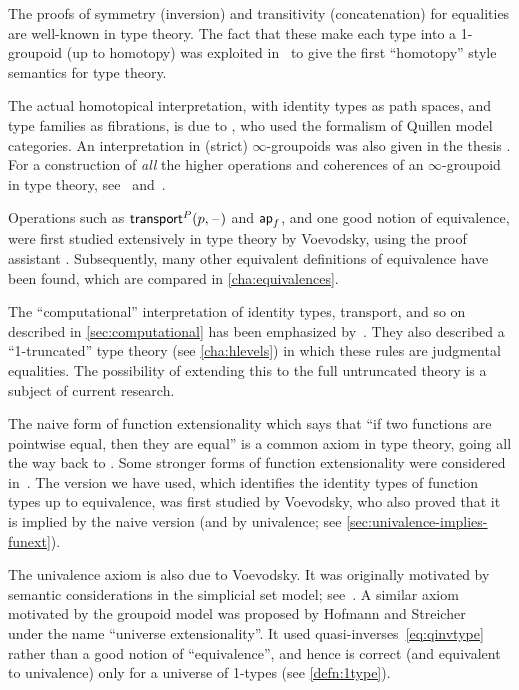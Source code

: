 The proofs of symmetry (inversion) and transitivity (concatenation) for equalities are well-known in type theory.
The fact that these make each type into a 1-groupoid (up to homotopy) was exploited in~\cite{hs:gpd-typethy} to give the first ``homotopy'' style semantics for type theory.  

The actual homotopical interpretation, with identity types as path spaces, and type families as fibrations, is due to \cite{AW}, who used the formalism of Quillen model categories.  An interpretation in (strict) $\infty$-groupoids was also given in the thesis \cite{mw:thesis}.
For a construction of \emph{all} the higher operations and coherences of an $\infty$-groupoid in type theory, see~\cite{pll:wkom-type} and~\cite{bg:type-wkom}.

%
Operations such as $\mathsf{transport}^{P}(p,\mathord{\hspace{1pt}\text{--}\hspace{1pt}})$ and $\mathsf{ap}_{f}$, and one good notion of equivalence, were first studied extensively in type theory by Voevodsky, using the proof assistant \Coq.
Subsequently, many other equivalent definitions of equivalence have been found, which are compared in \autoref{cha:equivalences}.

The ``computational'' interpretation of identity types, transport, and so on described in \autoref{sec:computational} has been emphasized by~\cite{lh:canonicity}.
They also described a ``1-truncated'' type theory (see \autoref{cha:hlevels}) in which these rules are judgmental equalities.
The possibility of extending this to the full untruncated theory is a subject of current research.

%
The naive form of function extensionality which says that ``if two functions are pointwise equal, then they are equal'' is a common axiom in type theory, going all the way back to \cite{PM2}.
Some stronger forms of function extensionality were considered in~\cite{garner:depprod}.
The version we have used, which identifies the identity types of function types up to equivalence, was first studied by Voevodsky, who also proved that it is implied by the naive version (and by univalence; see \autoref{sec:univalence-implies-funext}).

%
The univalence axiom is also due to Voevodsky.
It was originally motivated by semantic considerations in the simplicial set model; see~\cite{klv:ssetmodel}.
A similar axiom motivated by the groupoid model was proposed by Hofmann and Streicher~\cite{hs:gpd-typethy} under the name ``universe extensionality''.
It used quasi-inverses~\eqref{eq:qinvtype} rather than a good notion of ``equivalence'', and hence is correct (and equivalent to univalence) only for a universe of 1-types (see \autoref{defn:1type}).

